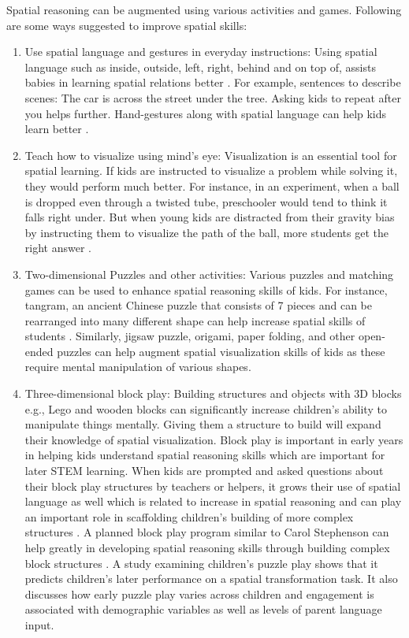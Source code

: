 Spatial reasoning can be augmented using various activities and games. Following are some ways suggested to improve spatial skills:
\begin{enumerate}
    \item Use spatial language and gestures in everyday instructions: Using spatial language such as inside, outside, left, right, behind and on top of, assists babies in learning spatial relations better \parencite{casasola2008development}. For example, sentences to describe scenes: The car is across the street under the tree. Asking kids to repeat after you helps further. Hand-gestures along with spatial language can help kids learn better \parencite{singer2005children}.
    \item Teach how to visualize using mind's eye: Visualization is an essential tool for spatial learning. If kids are instructed to visualize a problem while solving it, they would perform much better. For instance, in an experiment, when a ball is dropped even through a twisted tube, preschooler would tend to think it falls right under. But when young kids are distracted from their gravity bias by instructing them to visualize the path of the ball, more students get the right answer \parencite{joh2011imagining}.
    \item Two-dimensional Puzzles and other activities: Various puzzles and matching games can be used to enhance spatial reasoning skills of kids. For instance, tangram, an ancient Chinese puzzle that consists of 7 pieces and can be rearranged into many different shape can help increase spatial skills of students \parencite{siew2013facilitating}.  Similarly, jigsaw puzzle, origami, paper folding, and other open-ended puzzles can help augment spatial visualization skills of kids as these require mental manipulation of various shapes. 
    \item Three-dimensional block play: Building structures and objects with 3D blocks e.g., Lego\textsuperscript\textregistered{} \parencite{wolfgang2003advanced} and wooden blocks can significantly increase children's ability to manipulate things mentally. Giving them a structure to build will expand their knowledge of spatial visualization. Block play is important in early years in helping kids understand spatial reasoning skills which are important for later STEM learning. When kids are prompted and asked questions about their block play structures by teachers or helpers, it grows their use of spatial language as well which is related to increase in spatial reasoning \parencite{pruden2011children} and can play an important role in scaffolding children’s building of more complex structures \parencite{kersh2008research}. A planned block play program similar to Carol Stephenson can help greatly in developing spatial reasoning skills through building complex block structures \parencite{tepylo2015developmental}. A study examining children's puzzle play \parencite{levine2012early} shows that it predicts children's later performance on a spatial transformation task. It also discusses how early puzzle play varies across children and engagement is associated with demographic variables as well as levels of parent language input.

\end{enumerate}
